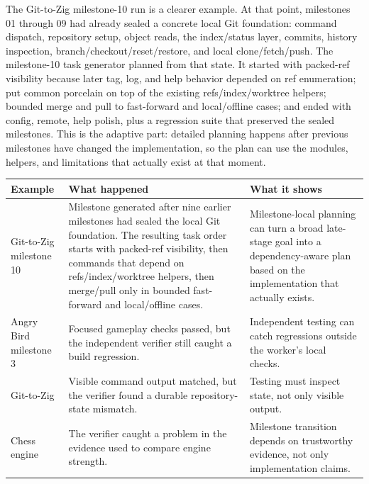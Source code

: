 \documentclass[11pt,a4paper]{article}
\renewcommand{\arraystretch}{1.18}
\newcommand{\code}[1]{#1}
\begin{document}
The \code{Git-to-Zig} milestone-10 run is a clearer example. At that point, milestones 01 through 09 had already sealed a concrete local Git foundation: command dispatch, repository setup, object reads, the index/status layer, commits, history inspection, branch/checkout/reset/restore, and local clone/fetch/push. The milestone-10 task generator planned from that state. It started with packed-ref visibility because later \code{tag}, \code{log}, and \code{help} behavior depended on ref enumeration; put common porcelain on top of the existing refs/index/worktree helpers; bounded merge and pull to fast-forward and local/offline cases; and ended with config, remote, help polish, plus a regression suite that preserved the sealed milestones. This is the adaptive part: detailed planning happens after previous milestones have changed the implementation, so the plan can use the modules, helpers, and limitations that actually exist at that moment.

\begingroup
\renewcommand{\arraystretch}{1.25}
\setlength{\tabcolsep}{6pt}
\footnotesize
\noindent\begin{tabular}{@{}p{2.8cm}p{6.3cm}p{5.5cm}@{}}
\toprule
\rowcolor{tablehead}\textbf{\color{white}Example} & \textbf{\color{white}What happened} & \textbf{\color{white}What it shows} \\
\midrule
\code{Git-to-Zig} milestone 10 & Milestone generated after nine earlier milestones had sealed the local Git foundation. The resulting task order starts with packed-ref visibility, then commands that depend on refs/index/worktree helpers, then merge/pull only in bounded fast-forward and local/offline cases. & Milestone-local planning can turn a broad late-stage goal into a dependency-aware plan based on the implementation that actually exists. \\
\rowcolor{tableband}
\code{Angry Bird} milestone 3 & Focused gameplay checks passed, but the independent verifier still caught a build regression. & Independent testing can catch regressions outside the worker's local checks. \\
\code{Git-to-Zig} & Visible command output matched, but the verifier found a durable repository-state mismatch. & Testing must inspect state, not only visible output. \\
\rowcolor{tableband}
\code{Chess engine} & The verifier caught a problem in the evidence used to compare engine strength. & Milestone transition depends on trustworthy evidence, not only implementation claims. \\
\bottomrule
\end{tabular}
\endgroup
\end{document}
